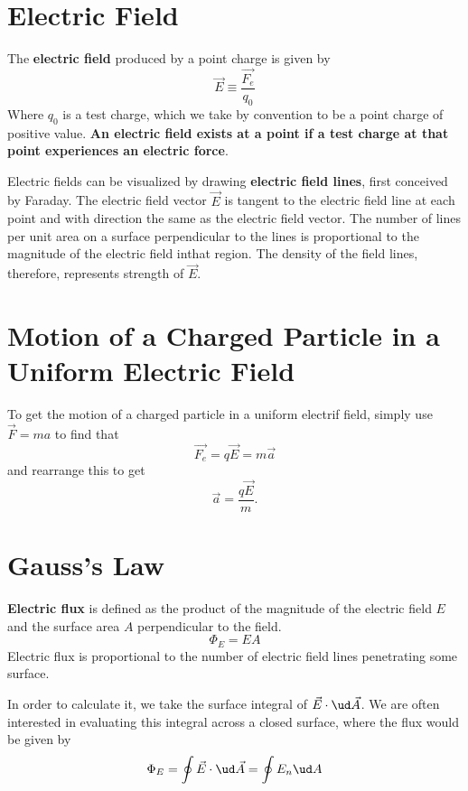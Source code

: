 \section{Electric Field}

The \textbf{electric field} produced by a point charge is given by 
\begin{equation}
  \label{eq:electricfield}
  \vec{E} \equiv \frac{\vec{F_e}}{q_0}
\end{equation}
Where $q_0$ is a test charge, which we take by convention to be a point charge
of positive value. \textbf{An electric field exists at a point if a test charge
at that point experiences an electric force}.

Electric fields can be visualized by drawing \textbf{electric field lines},
first conceived by Faraday. The electric field vector $\vec{E}$ is tangent to
the electric field line at each point and with direction the same as the
electric field vector. The number of lines per unit area on a surface
perpendicular to the lines is proportional to the magnitude of the electric
field inthat region. The density of the field lines, therefore, represents
strength of $\vec{E}$.


\section{Motion of a Charged Particle in a Uniform Electric Field}

To get the motion of a charged particle in a uniform electrif field, simply use
$\vec{F}=ma$ to find that
\[ \vec{F_e} = q\vec{E} = m\vec{a} \]
and rearrange this to get
\begin{equation}
  \vec{a} = \frac{q\vec{E}}{m}.
\end{equation}


\section{Gauss's Law}


\textbf{Electric flux} is defined as the product of the
magnitude of the electric field $E$ and the surface area $A$ perpendicular to
the field.
\begin{equation}
  \Phi_E = EA
\end{equation}
Electric flux is proportional to the number of electric field lines penetrating
some surface.

In order to calculate it, we take the surface integral of $\vec E \cdot \ud \vec
A$. We are often interested in evaluating this integral across a closed surface,
where the flux would be given by
\begin{equation}
  \label{eq:electricflux}
  \Phi_E = \oint \vec E \cdot \ud \vec A = \oint E_n \ud A
\end{equation}

